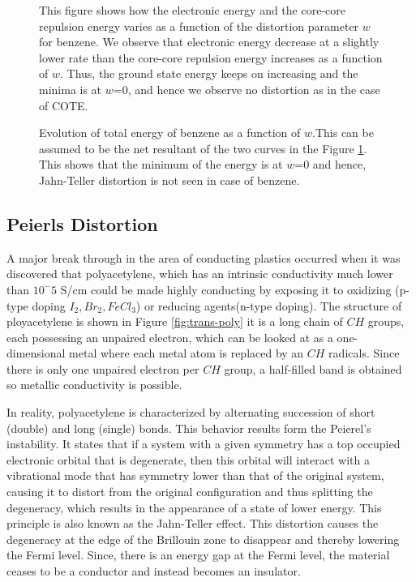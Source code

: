\documentclass[9pt,twocolumn,twoside]{optica}
\begin{document}
\begin{figure}[H]
\centering
{}
\caption{This figure shows how the electronic energy and the core-core repulsion energy varies as a function of the distortion parameter $w$ for benzene. We observe that electronic energy decrease at a slightly lower rate than the core-core repulsion energy increases as a function of $w$. Thus, the ground state energy keeps on increasing and the minima is at $w$=0, and hence we observe no distortion as in the case of COTE.  }
\label{fig:ben_both}
\end{figure}



\begin{figure}[H]
\centering
{}
\caption{Evolution of total energy of benzene as a function of $w$.This can be assumed to be the net resultant of the two curves in the Figure \ref{fig:ben_both}. This shows that the minimum of the energy is at $w$=0 and hence, Jahn-Teller distortion is not seen in case of benzene.  }
\label{fig:ben_total}
\end{figure}
















\subsection{ Peierls Distortion }

A major break through in the area of conducting plastics occurred when it was discovered that polyacetylene, which has an intrinsic conductivity much lower than $10^-5$ S/cm could be made highly conducting by exposing it to oxidizing (p-type doping  $I_2, Br_2, FeCl_3$) or reducing agents(n-type doping). The structure of ployacetylene is shown in Figure \ref{fig:trans-poly} it is a long chain of $CH$ groups, each possessing an unpaired electron, which can be looked at as a one-dimensional metal where each metal atom is replaced by an $CH$ radicals. Since there is only one unpaired electron per $CH$ group, a half-filled band is obtained so metallic conductivity is possible.

 In reality, polyacetylene  is characterized by alternating succession of short (double) and long (single) bonds. This behavior results form the Peierel's instability. It states that if a system with a given symmetry has a top occupied electronic orbital that is degenerate, then this orbital will interact
with a vibrational mode that has symmetry lower than that of the
original system, causing it to distort from the original configuration
and thus splitting the degeneracy, which results in the appearance
of a state of lower energy. This principle is also known as the Jahn-Teller
effect. This distortion causes the degeneracy at the edge of the Brillouin zone to disappear and thereby lowering the Fermi level. Since, there is an energy gap at the Fermi level, the material ceases to be a conductor and instead becomes an insulator.
\end{document}

